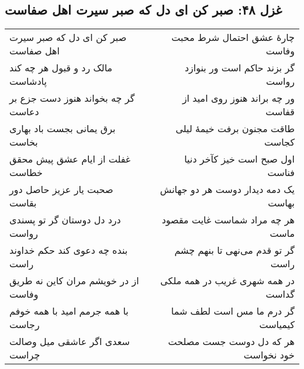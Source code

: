 \begin{center}
\section*{غزل ۴۸: صبر کن ای دل که صبر سیرت اهل صفاست}
\label{sec:048}
\begin{longtable}{l p{0.5cm} r}
صبر کن ای دل که صبر سیرت اهل صفاست
&&
چارهٔ عشق احتمال شرط محبت وفاست
\\
مالک رد و قبول هر چه کند پادشاست
&&
گر بزند حاکم است ور بنوازد رواست
\\
گر چه بخواند هنوز دست جزع بر دعاست
&&
ور چه براند هنوز روی امید از قفاست
\\
برق یمانی بجست باد بهاری بخاست
&&
طاقت مجنون برفت خیمهٔ لیلی کجاست
\\
غفلت از ایام عشق پیش محقق خطاست
&&
اول صبح است خیز کآخر دنیا فناست
\\
صحبت یار عزیز حاصل دور بقاست
&&
یک دمه دیدار دوست هر دو جهانش بهاست
\\
درد دل دوستان گر تو پسندی رواست
&&
هر چه مراد شماست غایت مقصود ماست
\\
بنده چه دعوی کند حکم خداوند راست
&&
گر تو قدم می‌نهی تا بنهم چشم راست
\\
از در خویشم مران کاین نه طریق وفاست
&&
در همه شهری غریب در همه ملکی گداست
\\
با همه جرمم امید با همه خوفم رجاست
&&
گر درم ما مس است لطف شما کیمیاست
\\
سعدی اگر عاشقی میل وصالت چراست
&&
هر که دل دوست جست مصلحت خود نخواست
\\
\end{longtable}
\end{center}

